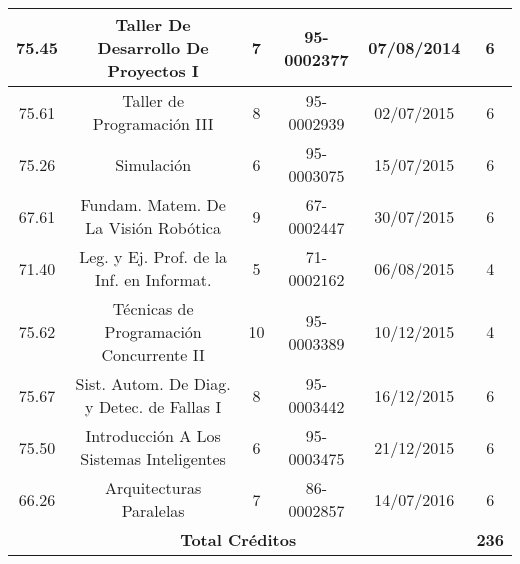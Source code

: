 {\begin{center}
\begin{tabular}{|c|c|c|c|c|c|}
            \hline
            75.45 & Taller De Desarrollo De Proyectos I         &  7   &  95-0002377  &  07/08/2014  & 6  \\
            \hline
            75.61 & Taller de Programación III                  &  8   &  95-0002939  &  02/07/2015  & 6  \\
            \hline
            75.26 & Simulación                                  &  6   &  95-0003075  &  15/07/2015  & 6  \\
            \hline
            67.61 & Fundam. Matem. De La Visión Robótica        &  9   &  67-0002447  &  30/07/2015  & 6  \\
            \hline
            71.40 & Leg. y Ej. Prof. de la Inf. en Informat.    &  5   &  71-0002162  &  06/08/2015  & 4  \\
            \hline
            75.62 & Técnicas de Programación Concurrente II     &  10  &  95-0003389  &  10/12/2015  & 4  \\
            \hline
            75.67 & Sist. Autom. De Diag. y Detec. de Fallas I  &  8   &  95-0003442  &  16/12/2015  & 6  \\
            \hline
            75.50 & Introducción A Los Sistemas Inteligentes    &  6   &  95-0003475  &  21/12/2015  & 6  \\
            \hline
            66.26 & Arquitecturas Paralelas                     &  7   &  86-0002857  &  14/07/2016  & 6  \\
            \hline
            \multicolumn{5}{|c|}{\textbf{Total Créditos}} & \textbf{236} \\
            \hline
        \end{tabular}
        \end{center}
    }
